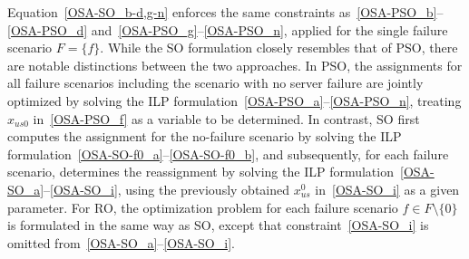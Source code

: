 \documentclass[10pt, letterpaper]{IEEEtran}
\begin{document}
\begin{CJK}{UTF8}{ipxm}
Equation~\eqref{OSA-SO_b-d,g-n} enforces the same constraints as~\eqref{OSA-PSO_b}--\eqref{OSA-PSO_d} and~\eqref{OSA-PSO_g}--\eqref{OSA-PSO_n}, applied for the single failure scenario $F = \{f\}$.
While the SO formulation closely resembles that of PSO, there are notable distinctions between the two approaches.
In PSO, the assignments for all failure scenarios including the scenario with no server failure are jointly optimized by solving the ILP formulation~\eqref{OSA-PSO_a}--\eqref{OSA-PSO_n}, treating $x_{us0}$ in~\eqref{OSA-PSO_f} as a variable to be determined.
In contrast, SO first computes the assignment for the no-failure scenario by solving the ILP formulation~\eqref{OSA-SO-f0_a}--\eqref{OSA-SO-f0_b}, and subsequently, for each failure scenario, determines the reassignment by solving the ILP formulation~\eqref{OSA-SO_a}--\eqref{OSA-SO_i}, using the previously obtained $x^0_{us}$ in~\eqref{OSA-SO_i} as a given parameter.
For RO, the optimization problem for each failure scenario $f \in F \setminus \{0\}$ is formulated in the same way as SO, except that constraint~\eqref{OSA-SO_i} is omitted from~\eqref{OSA-SO_a}--\eqref{OSA-SO_i}.


\end{CJK}
\end{document}
